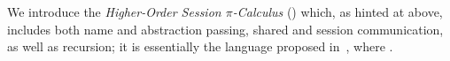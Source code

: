 \noindent 
We introduce the %
\emph{Higher-Order Session $\pi$-Calculus} (\HOp) which, as hinted at above, 
includes both name and abstraction passing, shared and session communication,  
as well as recursion; it is 
essentially 
the  language
proposed 
in~\cite{tlca07}, where . 

\smallskip





